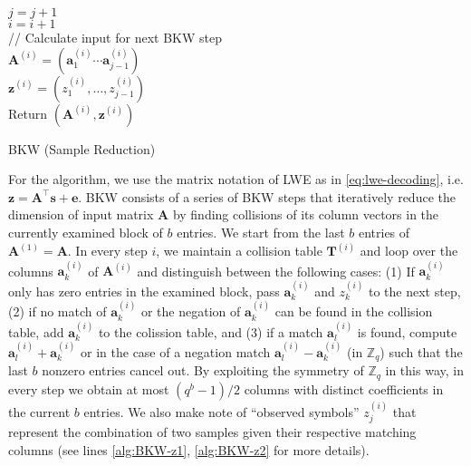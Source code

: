 \begin{algorithm2e}
{{{{{  $j = j + 1$\\
  }
  }
  }
  $i = i + 1$\\
  // Calculate input for next BKW step\\
  $\mathbf{A}^{(i)} = (\mathbf{a}_1^{(i)} \cdots \mathbf{a}_{j-1}^{(i)})$\\
  $\mathbf{z}^{(i)} = (z_1^{(i)}, \ldots, z_{j-1}^{(i)})$\\
  }
  Return $(\mathbf{A}^{(i)}, \mathbf{z}^{(i)})$
  }
  \caption{BKW (Sample Reduction)}\label{alg:BKW}
\end{algorithm2e} %

For the algorithm, we use the matrix notation of LWE as in \cref{eq:lwe-decoding}, i.e. $\mathbf{z} = \mathbf{A}^\intercal \mathbf{s} + \mathbf{e}$. BKW consists of a series of BKW steps that iteratively reduce the dimension of input matrix $\mathbf{A}$ by finding collisions of its column vectors in the currently examined block of $b$ entries. We start from the last $b$ entries of $\mathbf{A}^{(1)} = \mathbf{A}$. In every step $i$, we maintain a collision table $\mathbf{T}^{(i)}$ and loop over the columns $\mathbf{a}_k^{(i)}$ of $\mathbf{A}^{(i)}$ and distinguish between the following cases: (1) If $\mathbf{a}_k^{(i)}$ only has zero entries in the examined block, pass $\mathbf{a}_k^{(i)}$ and $z_k^{(i)}$ to the next step, (2) if no match of $\mathbf{a}_k^{(i)}$ or the negation of $\mathbf{a}_k^{(i)}$ can be found in the collision table, add $\mathbf{a}_k^{(i)}$ to the colission table, and (3) if a match $\mathbf{a}_l^{(i)}$ is found, compute $\mathbf{a}_l^{(i)} + \mathbf{a}_k^{(i)}$ or in the case of a negation match $\mathbf{a}_l^{(i)} - \mathbf{a}_k^{(i)}$ (in $\mathbb{Z}_q$) such that the last $b$ nonzero entries cancel out. By exploiting the symmetry of $\mathbb{Z}_q$ in this way, in every step we obtain at most $(q^b - 1)/2$ columns with distinct coefficients in the current $b$ entries. We also make note of ``observed symbols'' $z_j^{(i)}$ that represent the combination of two samples given their respective matching columns (see lines \ref{alg:BKW-z1}, \ref{alg:BKW-z2} for more details).

